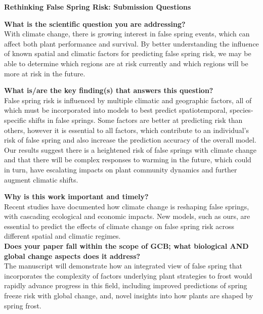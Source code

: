 \documentclass{article}\usepackage[]{graphicx}\usepackage[]{color}
\begin{document}
\nobibliography*
\noindent \textbf{\Large{Rethinking False Spring Risk: Submission Questions}}\\
\vspace{3ex}

\noindent \textbf{What is the scientific question you are addressing?} \\

\noindent With climate change, there is growing interest in false spring events, which can affect both plant performance and survival. By better understanding the influence of known spatial and climatic factors for predicting false spring risk, we may be able to determine which regions are at risk currently and which regions will be more at risk in the future.  %

\noindent \textbf{What is/are the key finding(s) that answers this question?} \\

\noindent False spring risk is influenced by multiple climatic and geographic factors, all of which must be incorporated into models to best predict spatiotemporal, species-specific shifts in false springs. Some factors are better at predicting risk than others, however it is essential to all factors, which contribute to an individual's risk of false spring and also increase the prediction accuracy of the overall model. Our results suggest there is a heightened risk of false springs with climate change and that there will be complex responses to warming in the future, which could in turn, have escalating impacts on plant community dynamics and further augment climatic shifts.  

\noindent \textbf{Why is this work important and timely?}\\

\noindent Recent studies have documented how climate change is reshaping false springs, with cascading ecological and economic impacts. New models, such as ours, are essential to predict the effects of climate change on false spring risk across different spatial and climatic regimes. \\

\noindent \textbf{ Does your paper fall within the scope of GCB; what biological AND global change aspects does it address?}\\

\noindent The manuscript will demonstrate how an integrated view of false spring that incorporates the complexity of factors underlying plant strategies to frost would rapidly advance progress in this field, including improved predictions of spring freeze risk with global change, and, novel insights into how plants are shaped by spring frost. \\ %
\end{document}
